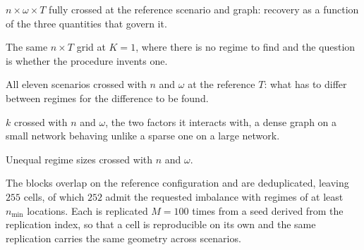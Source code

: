 \begin{description}[leftmargin=1.2em,itemsep=3pt,topsep=3pt]
  \item[\textbf{Core} (45 cells).] $n \times \omega \times T$ fully crossed at the reference scenario and graph: recovery as a function of the three quantities that govern it.
  \item[\textbf{Null} (15 cells).] The same $n \times T$ grid at $K=1$, where there is no regime to find and the question is whether the procedure invents one.
  \item[\textbf{Scenarios} (165 cells).] All eleven scenarios crossed with $n$ and $\omega$ at the reference $T$: what has to differ between regimes for the difference to be found.
  \item[\textbf{Graph} (45 cells).] $k$ crossed with $n$ and $\omega$, the two factors it interacts with, a dense graph on a small network behaving unlike a sparse one on a large network.
  \item[\textbf{Balance} (15 cells).] Unequal regime sizes crossed with $n$ and $\omega$.
\end{description}

The blocks overlap on the reference configuration and are deduplicated, leaving $255$ cells, of which $252$ admit the requested imbalance with regimes of at least $n_{\min}$ locations. Each is replicated $M = 100$ times from a seed derived from the replication index, so that a cell is reproducible on its own and the same replication carries the same geometry across scenarios.

